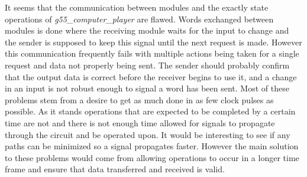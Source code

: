 \documentclass[12pt]{article}
\begin{document}
It seems that the communication between modules and the exactly state operations of \textit{g55\_computer\_player} are flawed. Words exchanged between modules is done where the receiving module waits for the input to change and the sender is supposed to keep this signal until the next request is made. However this communication frequently fails with multiple actions being taken for a single request and data not properly being sent. The sender should probably confirm that the output data is correct before the receiver begins to use it, and a change in an input is not robust enough to signal a word has been sent. Most of these problems stem from a desire to get as much done in as few clock pulses as possible. As it stands operations that are expected to be completed by a certain time are not and there is not enough time allowed for signals to propagate through the circuit and be operated upon. It would be interesting to see if any paths can be minimized so a signal propagates faster. However the main solution to these problems would come from allowing operations to occur in a longer time frame and ensure that data transferred and received is valid.
\end{document}
